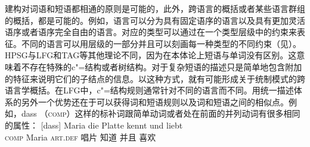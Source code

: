 建构对词语和短语都相通的原则是可能的，此外，跨语言的概括或者某些语言群组的概括，都是可能的。例如，语言可以分为具有固定语序的语言以及具有更加灵活语序或者语序完全自由的语言。对应的类型可以通过在一个类型层级中的约束来表征。不同的语言可以用层级的一部分并且可以刻画每一种类型的不同约束（见\citet[\S~9.2]{AW98a}）。HPSG\indexhpsgc 与LFG\indexlfgc 和TAG\indextagc 等其他理论不同，因为在本体论上短语与单词没有区别。这意味着不存在特殊的c"=结构或者树结构。对于复杂短语的描述只是简单地包含附加的特征来说明它们的子结点的信息。以这种方式，就有可能形成关于统制模式的跨语言学概括。在LFG中，c"=结构规则通常针对不同的语言而不同。用统一描述体系的另外一个优势还在于可以获得词和短语规则以及词和短语之间的相似点。例如，dass （\textsc{comp}）这样的标补词跟简单动词或者处在前面的并列动词有很多相同的属性：
\eal
\ex
\gll {}[dass] Maria die Platte kennt und liebt\\
	 {}\spacebr{}\textsc{comp} Maria \textsc{art}.\textsc{def} 唱片 知道 并且 喜欢\\
